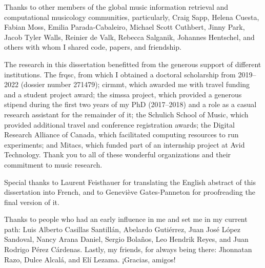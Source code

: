 Thanks to other members of the global music information
retrieval and computational musicology communities,
particularly, Craig Sapp, Helena Cuesta, Fabian Moss, Emilia
Parada-Cabaleiro, Michael Scott Cuthbert, Jinny Park, Jacob
Tyler Walls, Reinier de Valk, Rebecca Salganik, Johannes
Hentschel, and others with whom I shared code, papers, and
friendship.

The research in this dissertation benefitted from the
generous support of different institutions. The \gls{frqsc},
from which I obtained a doctoral scholarship from 2019--2022
(dossier number 271479); \gls{cirmmt}, which awarded me with
travel funding and a student project award; the \gls{simssa}
project, which provided a generous stipend during the first
two years of my PhD (2017--2018) and a role as a casual
research assistant for the remainder of it; the Schulich
School of Music, which provided additional travel and
conference registration awards; the Digital Research
Alliance of Canada, which facilitated computing resources to
run experiments; and Mitacs, which funded part of an
internship project at Avid Technology. Thank you to all of
these wonderful organizations and their commitment to music
research.

Special thanks to Laurent Feisthauer for translating the
English abstract of this dissertation into French, and to
Genevi\`eve Gates-Panneton for proofreading the final
version of it.

Thanks to people who had an early influence in me and set me
in my current path: Luis Alberto Casillas Santill\'an,
Abelardo Guti\'errez, Juan Jos\'e L\'opez Sandoval, Nancy
Arana Daniel, Sergio Bola\~nos, Leo Hendrik Reyes, and Juan
Rodrigo P\'erez C\'ardenas. Lastly, my friends, for always
being there: Jhonnatan Razo, Dulce Alcal\'a, and El\'i
Lezama. ¡Gracias, amigos!
